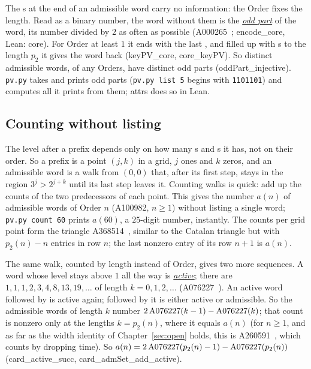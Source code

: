 \documentclass[10pt,a4paper,titlepage]{article}
\makeatletter
\newcommand{\termhere}[1]{\leavevmode
  \Hy@raisedlink{\hyper@anchorstart{term:#1}\hyper@anchorend}}
\newcommand{\keyterm}[2]{\hyperlink{box:#1}{\emph{#2}}}
\newcommand{\keysym}[2]{\hyperlink{box:#1}{#2}}
\newcommand{\lean}[1]{\textsf{#1}}
\newcommand{\pv}[1]{\texttt{pv.py #1}}
\makeatother
\begin{document}
\termhere{oddpart}The s at the end of an admissible word carry no information: the Order
fixes the length. Read as a binary number, the word without them is the \keyterm{oddpart}{odd part}
of the word, its number divided by $2$ as often as possible
(A000265~\cite{OEIS_A000265}; \lean{encode\_core}, Lean: \lean{core}). For Order at
least $1$ it ends with the last , and filled up with s to the length $p_2$ it
gives the word back (\lean{keyPV\_core}, \lean{core\_keyPV}). So distinct admissible words, of any
Orders, have distinct odd parts (\lean{oddPart\_injective}). \texttt{pv.py} takes and prints
odd parts (\pv{list 5} begins with \texttt{1101101}) and computes all it prints from them;
\lean{attrs} does so in Lean.

\subsection*{Counting without listing}

The level after a prefix depends only on how many s and s it has, not on
their order. So a prefix is a point $(j,k)$ in a grid, $j$ ones and $k$ zeros,
and an admissible word is a walk from $(0,0)$ that, after its first step, stays in the region
$3^j > 2^{j+k}$ until its last step leaves it. \termhere{an}Counting walks is quick: add up
the counts of the two predecessors of each point. This gives
the number \keysym{an}{$a(n)$} of admissible words of Order $n$ (A100982, $n \ge 1$) without listing a single word; \pv{count 60} prints $a(60)$,
a $25$-digit number, instantly. The counts per grid point form the triangle
A368514~\cite{OEIS_A368514}, similar to the Catalan triangle but with $p_2(n) - n$
entries in row $n$; the last nonzero entry of its row $n+1$ is $a(n)$.

\nopagebreak
The same walk, counted by length instead of Order, gives two more sequences.
\termhere{active}A word whose level stays above $1$ all the way is \keyterm{active}{active}; there are
$1, 1, 1, 2, 3, 4, 8, 13, 19, \dots$ of length $k = 0, 1, 2, \dots$
(A076227~\cite{OEIS_A076227}). An active word followed by  is active again;
followed by  it is either active or admissible. So the admissible words of
length $k$ number $2\,\mathrm{A076227}\index{OEIS!A076227}(k-1) - \mathrm{A076227}\index{OEIS!A076227}(k)$; that count is nonzero only at
the lengths $k = p_2(n)$, where it equals $a(n)$ (for $n \ge 1$, and as far as the
width identity of Chapter~\ref{sec:open} holds, this is
A260591~\cite{OEIS_A260591}, which counts by dropping time).
So $a(n) = 2\,\mathrm{A076227}\index{OEIS!A076227}(p_2(n)-1) - \mathrm{A076227}\index{OEIS!A076227}(p_2(n))$ (\lean{card\_active\_succ},
\lean{card\_admSet\_add\_active}).
\end{document}
